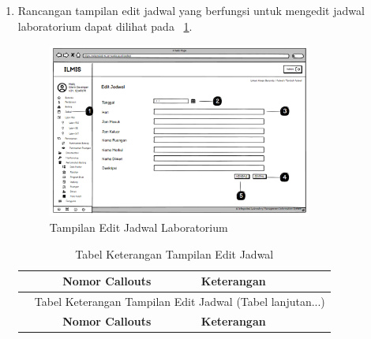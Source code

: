 \begin{enumerate}
	\item Rancangan tampilan edit jadwal yang berfungsi untuk mengedit jadwal laboratorium dapat dilihat pada \pic~\ref{fig:edit-jadwal}.
	      \begin{figure}
		      \centering
		      \includegraphics[width=0.82\textwidth]{konten/gambar/user interface/edit-jadwal.png}
		      \caption{Tampilan Edit Jadwal Laboratorium}
		      \label{fig:edit-jadwal}
	      \end{figure}

	      \begin{longtable}{c p{}}
		      \caption{Tabel Keterangan Tampilan Edit Jadwal}
		      \label{tab:edit-jadwal}                                                                                                                                                                 \\
		      \hline
		      \textbf{Nomor Callouts} & \textbf{Keterangan}                                                                                                                                           \\
		      \hline
		      \endfirsthead

		      \multicolumn{2}{c}{\small\tablename\ \thetable\ {Tabel Keterangan Tampilan Edit Jadwal} \space (Tabel lanjutan...)}                                                                     \\
		      \hline
		      \textbf{Nomor Callouts} & \textbf{Keterangan}                                                                                                                                           \\
		      \hline
		      \endhead


\end{longtable}
\end{enumerate}

